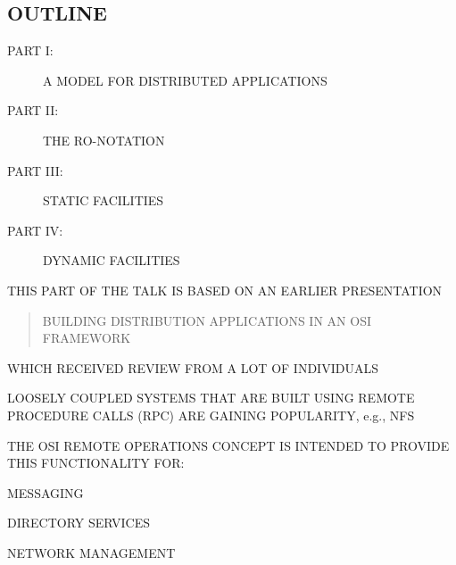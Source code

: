 


\begin{bwslide}
\part*	{OUTLINE}\bf

\begin{description}
\item[PART I:]		A MODEL FOR DISTRIBUTED APPLICATIONS

\item[PART II:]		THE RO-NOTATION

\item[PART III:]	STATIC FACILITIES

\item[PART IV:]		DYNAMIC FACILITIES
\end{description}
\end{bwslide}


\begin{bwslide}

\begin{nrtc}
\item	THIS PART OF THE TALK IS BASED ON AN EARLIER PRESENTATION
\begin{quote}
BUILDING DISTRIBUTION APPLICATIONS IN AN OSI FRAMEWORK
\end{quote}

\item	WHICH RECEIVED REVIEW FROM A LOT OF INDIVIDUALS
\end{nrtc}
\end{bwslide}


\begin{bwslide}

\begin{nrtc}
\item	LOOSELY COUPLED SYSTEMS THAT ARE BUILT USING REMOTE PROCEDURE CALLS
	(RPC) ARE GAINING POPULARITY, e.g., NFS

\item	THE OSI REMOTE OPERATIONS CONCEPT IS INTENDED TO PROVIDE THIS
	FUNCTIONALITY FOR:
    \begin{nrtc}
    \item	MESSAGING

    \item	DIRECTORY SERVICES

    \item	NETWORK MANAGEMENT
    \end{nrtc}
\end{nrtc}
\end{bwslide}


